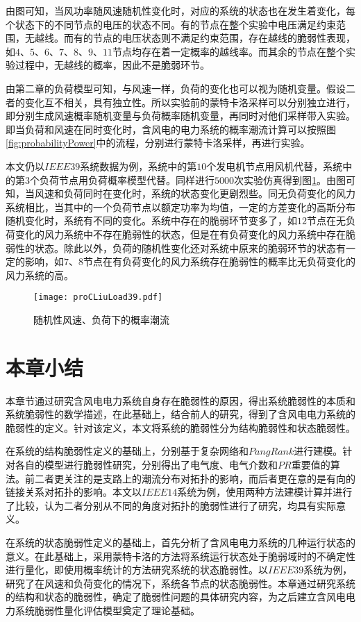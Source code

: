 由图可知，当风功率随风速随机性变化时，对应的系统的状态也在发生着变化，每个状态下的不同节点的电压的状态不同。有的节点在整个实验中电压满足约束范围，无越线。而有的节点的电压状态则不满足约束范围，存在越线的脆弱性表现，如$4$、$5$、$6$、$7$、$8$、$9$、$11$节点均存在着一定概率的越线率。而其余的节点在整个实验过程中，无越线的概率，因此不是脆弱环节。

由第二章的负荷模型可知，与风速一样，负荷的变化也可以视为随机变量。假设二者的变化互不相关，具有独立性。所以实验前的蒙特卡洛采样可以分别独立进行，即分别生成风速概率随机变量与负荷概率随机变量，再同时对他们采样带入实验。即当负荷和风速在同时变化时，含风电的电力系统的概率潮流计算可以按照图\ref{fig:probabilityPower}中的流程，分别进行蒙特卡洛采样，再进行实验。

本文仍以$IEEE39$系统数据为例，系统中的第$10$个发电机节点用风机代替，系统中的第$3$个负荷节点用负荷概率模型代替。同样进行$5000$次实验仿真得到图\ref{fig:proCLiuLoad39}。由图可知，当风速和负荷同时在变化时，系统的状态变化更剧烈些。同无负荷变化的风力系统相比，当其中的一个负荷节点以额定功率为均值，一定的方差变化的高斯分布随机变化时，系统有不同的变化。系统中存在的脆弱环节变多了，如$12$节点在无负荷变化的风力系统中不存在脆弱性的状态，但是在有负荷变化的风力系统中存在脆弱性的状态。除此以外，负荷的随机性变化还对系统中原来的脆弱环节的状态有一定的影响，如$7$、$8$节点在有负荷变化的风力系统存在脆弱性的概率比无负荷变化的风力系统的高。
\begin{figure}[H] %
  \centering
  \texttt{[image: proCLiuLoad39.pdf]}
  \caption{随机性风速、负荷下的概率潮流}
  \label{fig:proCLiuLoad39}
\end{figure}

\section{本章小结}
\label{sec:sum3}
本章节通过研究含风电电力系统自身存在脆弱性的原因，得出系统脆弱性的本质和系统脆弱性的数学描述，在此基础上，结合前人的研究，得到了含风电电力系统的脆弱性的定义。针对该定义，本文将系统的脆弱性分为结构脆弱性和状态脆弱性。

在系统的结构脆弱性定义的基础上，分别基于复杂网络和$PangRank$进行建模。针对各自的模型进行脆弱性研究，分别得出了电气度、电气介数和$PR$重要值的算法。前二者更关注的是支路上的潮流分布对拓扑的影响，而后者更在意的是有向的链接关系对拓扑的影响。本文以$IEEE14$系统为例，使用两种方法建模计算并进行了比较，认为二者分别从不同的角度对拓扑的脆弱性进行了研究，均具有实际意义。

在系统的状态脆弱性定义的基础上，首先分析了含风电电力系统的几种运行状态的意义。在此基础上，采用蒙特卡洛的方法将系统运行状态处于脆弱域时的不确定性进行量化，即使用概率统计的方法研究系统的状态脆弱性。以$IEEE39$系统为例，研究了在风速和负荷变化的情况下，系统各节点的状态脆弱性。本章通过研究系统的结构和状态的脆弱性，确定了脆弱性问题的具体研究内容，为之后建立含风电电力系统脆弱性量化评估模型奠定了理论基础。




